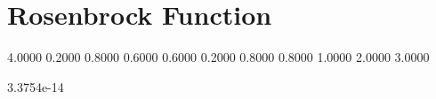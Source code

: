 \section{Rosenbrock Function}

4.0000    0.2000    0.8000    0.6000    0.6000    0.2000    0.8000    0.8000    1.0000    2.0000    3.0000

3.3754e-14
